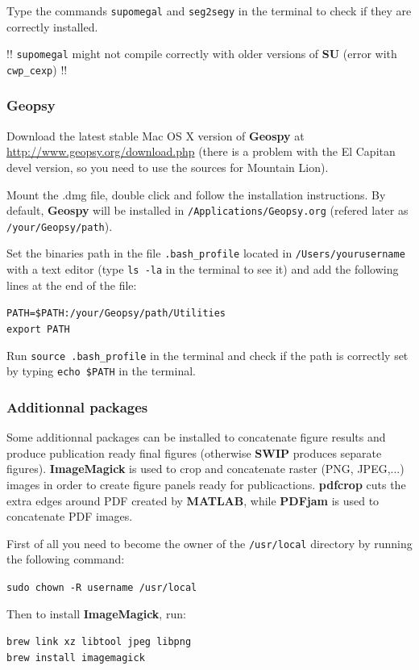 \documentclass[twoside,a4paper]{article}
\def\SWIP{\textbf{SWIP}}
\def\SU{\textbf{SU}}
\def\Geopsy{\textbf{Geospy}}
\def\ImageMagick{\textbf{ImageMagick}}
\def\PDFjam{\textbf{PDFjam}}
\def\pdfcrop{\textbf{pdfcrop}}
\def\MATLAB{\textbf{MATLAB}}
\begin{document}
Type the commands \verb|supomegal| and \verb|seg2segy| in the terminal to check if they are correctly installed.

!! \verb|supomegal| might not compile correctly with older versions of {\SU} (error with \verb|cwp_cexp|) !!

\subsubsection{Geopsy}
Download the latest stable Mac OS X version of {\Geopsy} at \url{http://www.geopsy.org/download.php} (there is a problem with the El Capitan devel version, so you need to use the sources for Mountain Lion).

Mount the .dmg file, double click and follow the installation instructions. By default, {\Geopsy} will be installed in \verb|/Applications/Geopsy.org| (refered later as \verb|/your/Geopsy/path|).

Set the binaries path in the file \verb|.bash_profile| located in \verb|/Users/yourusername| with a text editor (type \verb|ls -la| in the terminal to see it) and add the following lines at the end of the file:

\verb|PATH=$PATH:/your/Geopsy/path/Utilities|\\
\verb|export PATH|

Run \verb|source .bash_profile| in the terminal and check if the path is correctly set by typing \verb|echo $PATH| in the terminal.

\subsubsection{Additionnal packages}
Some additionnal packages can be installed to concatenate figure results and produce publication ready final figures (otherwise {\SWIP} produces separate figures). {\ImageMagick} is used to crop and concatenate raster (PNG, JPEG,...) images in order to create figure panels ready for publicactions. {\pdfcrop} cuts the extra edges around PDF created by {\MATLAB}, while {\PDFjam} is used to concatenate PDF images.

First of all you need to become the owner of the \verb|/usr/local| directory by running the following command:

\verb|sudo chown -R username /usr/local|

Then to install {\ImageMagick}, run:

\verb|brew link xz libtool jpeg libpng|\\
\verb|brew install imagemagick|
\end{document}
